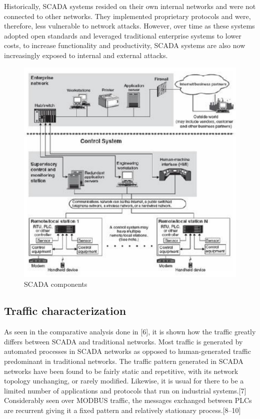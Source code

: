 \documentclass[11pt,a4paper]{article}
\begin{document}
Historically, SCADA systems resided on their own internal networks and
were not connected to other networks. They implemented proprietary
protocols and were, therefore, less vulnerable to network attacks.
However, over time as these systems adopted open standards and leveraged
traditional enterprise systems to lower costs, to increase functionality
and productivity, SCADA systems are also now increasingly exposed to
internal and external attacks.

\begin{figure}

{\centering \includegraphics{thesis_files/figure-latex/unnamed-chunk-4-1} 

}

\caption{SCADA components}\label{fig:unnamed-chunk-4}
\end{figure}

\subsection{Traffic characterization}\label{traffic-characterization}

As seen in the comparative analysis done in {[}6{]}, it is shown how the
traffic greatly differs between SCADA and traditional networks. Most
traffic is generated by automated processes in SCADA networks as opposed
to human-generated traffic predominant in traditional networks. The
traffic pattern generated in SCADA networks have been found to be fairly
static and repetitive, with its network topology unchanging, or rarely
modified. Likewise, it is usual for there to be a limited number of
applications and protocols that run on industrial systems.{[}7{]}
Considerably seen over MODBUS traffic, the messages exchanged between
PLCs are recurrent giving it a fixed pattern and relatively stationary
process.{[}8--10{]}
\end{document}
